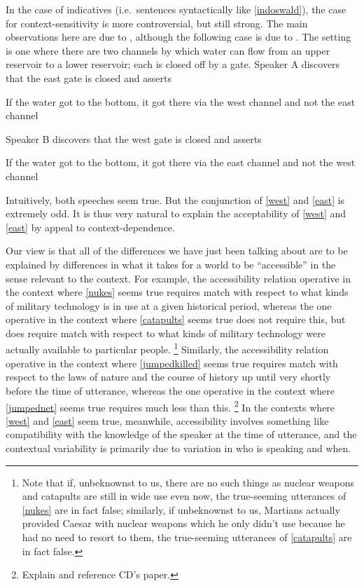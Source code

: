 \documentclass[If.tex]{subfiles}
\begin{document}
In the case of indicatives (i.e.~sentences syntactically like \ref{indoswald}), the case for context-sensitivity is more controversial, but still strong. The main observations here are due to \citet{GibbardTRTC}, although the following case is due to \citet{BennettPGC}. The setting is one where there are two channels by which water can flow from an upper reservoir to a lower reservoir; each is closed off by a gate. Speaker A discovers that the east gate is closed and asserts
\begin{prop}
	\nitem \label{west}
	If the water got to the bottom, it got there via the west channel and not the east channel
\end{prop}
Speaker B discovers that the west gate is closed and asserts
\begin{prop}
	\nitem \label{east}
	If the water got to the bottom, it got there via the east channel and not the west channel
\end{prop}
Intuitively, both speeches seem true.  But the conjunction of \ref{west} and \ref{east} is extremely odd. It is thus very natural to explain the acceptability of \ref{west} and \ref{east} by appeal to context-dependence.


Our view is that all of the differences we have just been talking about are to be explained by differences in what it takes for a world to be “accessible” in the sense relevant to the context. For example, the accessibility relation operative in the context where \ref{nukes} seems true requires match with respect to what kinds of military technology is in use at a given historical period, whereas the one operative in the context where \ref{catapults} seems true does not require this, but does require match with respect to what kinds of military technology were actually available to particular people.%
\footnote{Note that if, unbeknownst to us, there are no such things as nuclear weapons and catapults are still in wide use even now, the true-seeming utterances of \ref{nukes} are in fact false; similarly, if unbeknownst to us, Martians actually provided Caesar with nuclear weapons which he only didn't use because he had no need to resort to them, the true-seeming utterances of \ref{catapults} are in fact false.} 
Similarly, the accessibility relation operative in the context where \ref{jumpedkilled} seems true requires match with respect to the laws of nature and the course of history up until very shortly before the time of utterance, whereas the one operative in the context where \ref{jumpednet} seems true requires much less than this.%
\footnote{Explain and reference CD's paper.}
In the contexts where \ref{west} and \ref{east} seem true, meanwhile, accessibility involves something like compatibility with the knowledge of the speaker at the time of utterance, and the contextual variability is primarily due to variation in who is speaking and when.
\end{document}
